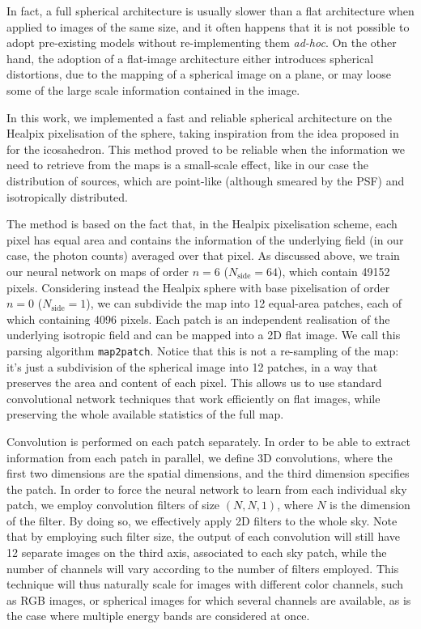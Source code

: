 In fact, a full spherical architecture is usually slower than a flat architecture when applied to images of the same size, and it often happens that it is not possible to adopt pre-existing models without re-implementing them \textit{ad-hoc}. 
On the other hand, the adoption of a flat-image architecture either introduces spherical distortions, due to the mapping of a spherical image on a plane, or may loose some of the large scale information contained in the image.

In this work, we  implemented a fast and reliable spherical architecture on the Healpix pixelisation of the sphere, taking inspiration from the idea proposed in \cite{mapped-convolutions} for the icosahedron. This method proved to be reliable when the information we need to retrieve from the maps is a small-scale effect, like in our case the distribution of sources, which are point-like (although smeared by the PSF) and isotropically distributed.


The method is based on the fact that, in the Healpix pixelisation scheme, each pixel has equal area and contains the information of the underlying field (in our case, the photon counts) averaged over that pixel. As discussed above, we train our neural network on maps of order $n=6$ ($N_\textrm{side}=64$), which contain 49152 pixels. Considering instead the Healpix sphere with base pixelisation  of order $n=0$ ($N_\textrm{side}=1$), we can subdivide the map into 12 equal-area patches, each of which containing 4096 pixels. Each patch is an independent realisation of the underlying isotropic field and can be mapped into a 2D flat image. We call this parsing algorithm \verb|map2patch|. Notice that this is not a re-sampling of the map: it's just a subdivision of the spherical image into 12 patches, in a way that preserves the area and content of each pixel. This allows us to use standard convolutional network techniques that work efficiently on flat images, while preserving the whole available statistics of the full map.  


Convolution is performed on each patch separately. In order to be able to extract information from each patch in parallel, we define 3D convolutions, where the first two dimensions are the spatial dimensions, and the third dimension specifies the patch. In order to force the neural network to learn from each individual sky patch, we employ convolution filters of size $(N,N,1)$, where $N$ is the dimension of the filter. By doing so, we effectively apply 2D filters to the whole sky. Note that by employing such filter size, the output of each convolution will still have 12 separate images on the third axis, associated to each sky patch, while the number of channels will vary according to the number of filters employed. This technique will thus naturally scale for images with different color channels, such as RGB images, or spherical images for which several channels are available, as is the case where multiple energy bands are considered at once.

